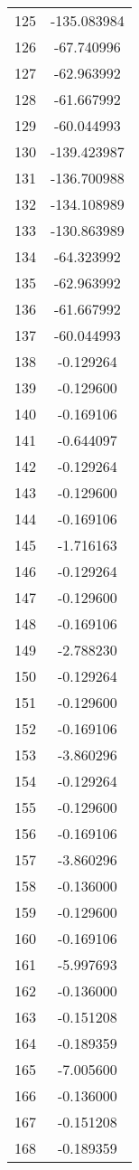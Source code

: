 \documentclass[12pt]{article}
\begin{document}
\begin{longtable}{@{}cc@{}}
125 & -135.083984 \\
126 & -67.740996 \\
127 & -62.963992 \\
128 & -61.667992 \\
129 & -60.044993 \\
130 & -139.423987 \\
131 & -136.700988 \\
132 & -134.108989 \\
133 & -130.863989 \\
134 & -64.323992 \\
135 & -62.963992 \\
136 & -61.667992 \\
137 & -60.044993 \\
138 & -0.129264 \\
139 & -0.129600 \\
140 & -0.169106 \\
141 & -0.644097 \\
142 & -0.129264 \\
143 & -0.129600 \\
144 & -0.169106 \\
145 & -1.716163 \\
146 & -0.129264 \\
147 & -0.129600 \\
148 & -0.169106 \\
149 & -2.788230 \\
150 & -0.129264 \\
151 & -0.129600 \\
152 & -0.169106 \\
153 & -3.860296 \\
154 & -0.129264 \\
155 & -0.129600 \\
156 & -0.169106 \\
157 & -3.860296 \\
158 & -0.136000 \\
159 & -0.129600 \\
160 & -0.169106 \\
161 & -5.997693 \\
162 & -0.136000 \\
163 & -0.151208 \\
164 & -0.189359 \\
165 & -7.005600 \\
166 & -0.136000 \\
167 & -0.151208 \\
168 & -0.189359 \\

\end{longtable}
\end{document}
